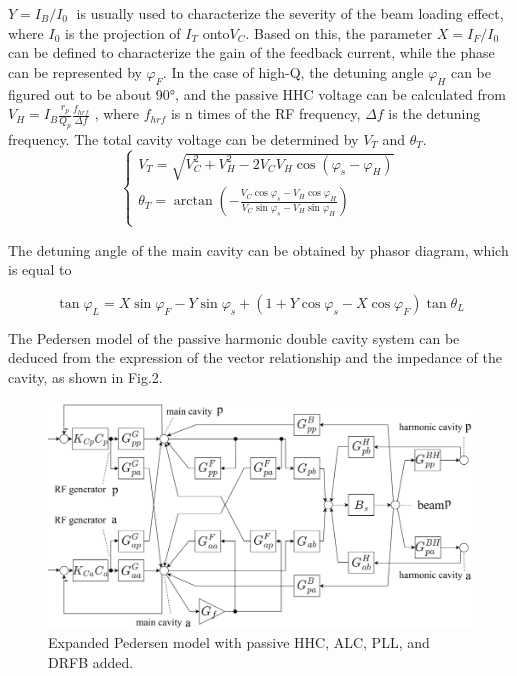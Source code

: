 \documentclass[letterpaper,
               nospread,     %
               ]{jacow}
\begin{document}
$Y={{{I}_{B}}}/{{{I}_{0}}}\;$ is usually used to characterize the severity of the beam loading effect, where ${{I}_{0}}$ is the projection of ${{I}_{T}}$ onto${{V}_{C}}$. Based on this, the parameter $X={{{I}_{F}}}/{{{I}_{0}}}\;$ can be defined to characterize the gain of the feedback current, while the phase can be represented by ${{\varphi }_{F}}$. In the case of high-Q, the detuning angle ${{\varphi }_{H}}$ can be figured out to be about 90°, and the passive HHC voltage can be calculated from ${{V}_{H}}={{I}_{B}}\frac{{{r}_{p}}}{{{Q}_{p}}}\frac{{{f}_{hrf}}}{\Delta f}$ \cite{ref7}, where ${{f}_{hrf}}$ is n times of the RF frequency, ${\Delta f}$ is the detuning frequency. The total cavity voltage can be determined by ${{V}_{T}}$ and ${{\theta }_{T}}$.
\begin{equation}\label{eq:label}
   \left\{ \begin{matrix}
      {{V}_{T}}=\sqrt{V_{C}^{2}+V_{H}^{2}-2{{V}_{C}}{{V}_{H}}\cos ({{\varphi }_{s}}-{{\varphi }_{H}})}                                                                            \\
      {{\theta }_{T}}=\arctan \left( -\frac{{{V}_{C}}\cos {{\varphi }_{s}}-{{V}_{H}}\cos {{\varphi }_{H}}}{{{V}_{C}}\sin {{\varphi }_{s}}-{{V}_{H}}\sin {{\varphi }_{H}}} \right) \\
   \end{matrix} \right.
\end{equation}

The detuning angle of the main cavity can be obtained by phasor diagram, which is equal to
\begin{footnotesize}
   \begin{equation}\label{eq:label}
      \tan {{\varphi }_{L}}=X\sin {{\varphi }_{F}}-Y\sin {{\varphi }_{s}}+\left( 1+Y\cos {{\varphi }_{s}}-X\cos {{\varphi }_{F}} \right)\tan {{\theta }_{L}}
   \end{equation}
\end{footnotesize}

The Pedersen model of the passive harmonic double cavity system can be deduced from the expression of the vector relationship and the impedance of the cavity, as shown in Fig.2.
\begin{figure}[!htb]
   \centering
   \includegraphics*[width=1\columnwidth]{THPA037_f2}
   \caption{Expanded Pedersen model with passive HHC, ALC, PLL, and DRFB added.}
   \label{fig:paper_layout}
\end{figure}
\end{document}
